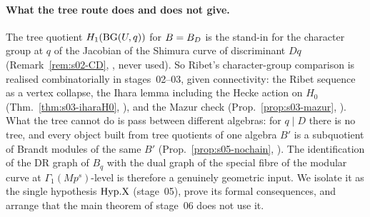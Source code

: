 \paragraph{What the tree route does and does not give.} The tree quotient $H_1(\mathrm{BG}(U,q))$ for $B=B_D$ is the stand-in for the
character group at $q$ of the Jacobian of the Shimura curve of discriminant $Dq$ (Remark~\ref{rem:s02-CD}, \stcited, never used).
So Ribet's character-group comparison is realised combinatorially in stages~02--03, given connectivity: the Ribet sequence as a
vertex collapse, the Ihara lemma including the Hecke action on $H_0$ (Thm.~\ref{thm:s03-iharaH0}, \stpmc), and the Mazur check
(Prop.~\ref{prop:s03-mazur}, \stpmc). What the tree cannot do is pass between different algebras: for $q\mid D$ there is no tree,
and every object built from tree quotients of one algebra $B'$ is a subquotient of Brandt modules of the same $B'$
(Prop.~\ref{prop:s05-nochain}, \stproved). The identification of the DR graph of $B_q$ with the dual graph of the special fibre of
the modular curve at $\Gamma_1(Mp^s)$-level is therefore a genuinely geometric input. We isolate it as the single hypothesis
$\mathrm{Hyp.X}$ (stage~05), prove its formal consequences, and arrange that the main theorem of stage~06 does not use it.
